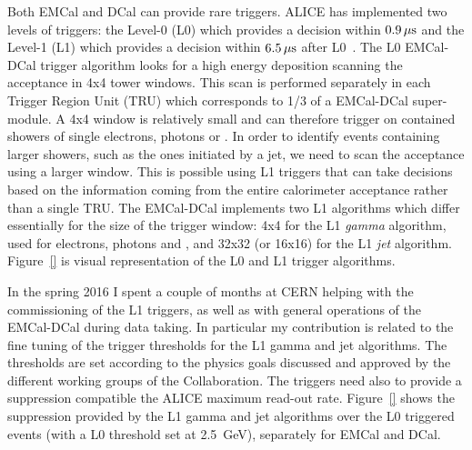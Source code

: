 \documentclass[12pt, a4paper, twoside, titlepage]{article}
\begin{document}
Both EMCal and DCal can provide rare triggers. ALICE has implemented two levels of triggers: the Level-0 (L0) which provides a decision within 
$0.9\,\rm \mu s$ and the Level-1 (L1) which provides a decision within $6.5\,\rm \mu s$ after L0~\cite{}. The L0 EMCal-DCal trigger algorithm looks for a high energy
deposition scanning the acceptance in 4x4 tower windows. This scan is performed separately in each Trigger Region Unit (TRU) which corresponds to 1/3 of a EMCal-DCal super-module.
A 4x4 window is relatively small and can therefore trigger on contained showers of single electrons, photons or \pizero.
In order to identify events containing larger showers, such as the ones initiated by a jet, we need to scan the acceptance using a larger window. This is possible using
L1 triggers that can take decisions based on the information coming from the entire calorimeter acceptance rather than a single TRU. The EMCal-DCal implements two L1 algorithms
which differ essentially for the size of the trigger window: 4x4 for the L1 \emph{gamma} algorithm, used for electrons, photons and \pizero, and 32x32 (or 16x16) for the L1 \emph{jet} algorithm.
Figure~\ref{} is visual representation of the L0 and L1 trigger algorithms.

In the spring 2016 I spent a couple of months at CERN helping with the commissioning of the L1 triggers, as well as with general operations of the EMCal-DCal during data taking.
In particular my contribution is related to the fine tuning of the trigger thresholds for the L1 gamma and jet algorithms. The thresholds are set according to the physics goals discussed
and approved by the different working groups of the Collaboration. The triggers need also to provide a suppression compatible the ALICE maximum read-out rate.
Figure~\ref{} shows the suppression provided by the L1 gamma and jet algorithms over the L0 triggered events (with a L0 threshold set at 2.5~GeV), separately for EMCal and DCal.

{}

\end{document}

